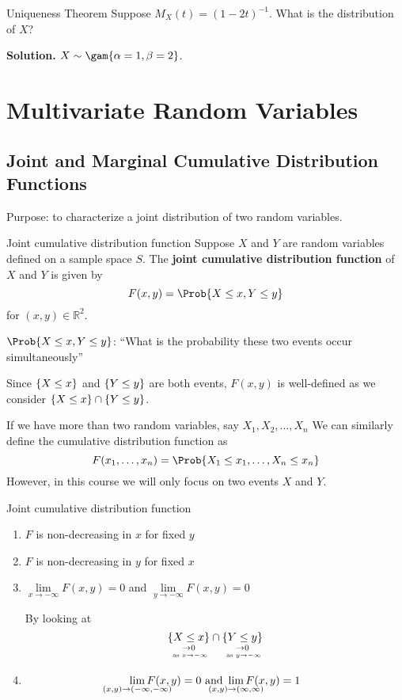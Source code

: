 \begin{Example}{Uniqueness Theorem}{}
    Suppose $ M_X(t)=(1-2t)^{-1} $. What is the
    distribution of $ X $?

    \textbf{Solution.} $ X \sim \gam{\alpha=1,\beta=2}$.
\end{Example}

\chapter{Multivariate Random Variables}
\section{Joint and Marginal Cumulative Distribution Functions}
Purpose: to characterize a joint distribution
of two random variables.
\begin{Definition}{Joint cumulative distribution function}{}
    Suppose $ X $ and $ Y $ are random variables defined on
    a sample space $ S $. The \textbf{joint cumulative
        distribution function} of $ X $ and $ Y $ is given by
    \[ F(x,y)=\Prob{X\le x,Y\le y} \]
    for $ (x,y)\in\mathbb{R}^2 $.
\end{Definition}
$ \Prob{X\le x,Y\le y} $:
``What is the probability these two events occur simultaneously''
\begin{Remark}{}{}
    Since $ \{X\le x\} $ and $ \{Y\le y\} $
    are both events, $ F(x,y) $ is well-defined as
    we consider $ \{X\le x\}\cap \{Y\le y\} $.
\end{Remark}
\begin{Remark}{}{}
    If we have more than two random variables, say $ X_1,X_2,\ldots,X_n $
    We can similarly define the cumulative distribution function as
    \[ F(x_1,\ldots,x_n)=\Prob{X_1\le x_1,\ldots,X_n\le x_n} \]
    However, in this course we will only focus on two events $ X $ and $ Y $.
\end{Remark}

\begin{Definition}{Joint cumulative distribution function}{}
    \begin{enumerate}[label=(\Roman*)]
        \item $ F $ is non-decreasing in $ x $ for fixed $ y $
        \item $ F $ is non-decreasing in $ y $ for fixed $ x $
        \item $ \displaystyle \lim\limits_{{x} \to {-\infty}} F(x,y)=0 $
              and $ \displaystyle \lim\limits_{{y} \to {-\infty}} F(x,y)=0 $

              By looking at
              \[ \underset{\underset{\text{ as }x\to-\infty}{\to 0}}{\{X\le x\}}\cap
                  \underset{\underset{\text{ as }y\to-\infty}{\to 0}}{\{Y\le y\}} \]
        \item \[ \displaystyle
                  \smashoperator{\lim\limits_{{(x,y)} \to {(-\infty,-\infty)}}}
                  F(x,y)=0\text{ and }
                  \displaystyle
                  \smashoperator{\lim\limits_{{(x,y)} \to {(\infty,\infty)}}}
                  F(x,y)=1 \]
    \end{enumerate}
\end{Definition}

